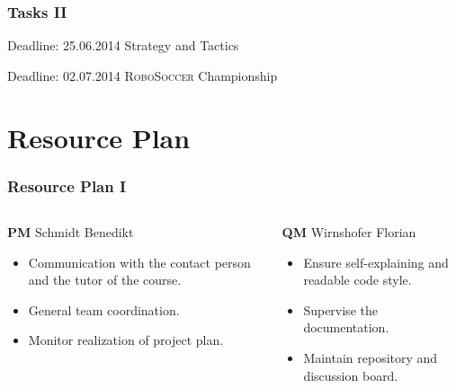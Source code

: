 \documentclass[hyperref={pdfpagelabels=false}]{beamer}
\begin{document}
\begin{frame}
	\frametitle{Tasks II} 
	\begin{block}{Deadline: 25.06.2014}
			Strategy and Tactics
	\end{block}
	\begin{block}{Deadline: 02.07.2014}
			\textsc{RoboSoccer} Championship
	\end{block}
\end{frame}

\section{Resource Plan} 
\begin{frame}
	\frametitle{Resource Plan I}
	\begin{columns}[t]
		\begin{column}{0.50\textwidth}
			\begin{block}{\textbf{PM} Schmidt Benedikt}
				\begin{itemize}
					\item Communication with the contact person and the tutor of the course.
					\item General team coordination.
					\item Monitor realization of project plan.
				\end{itemize}
			\end{block}
		\end{column}
		
		\begin{column}{0.50\textwidth}
			\begin{block}{\textbf{QM} Wirnshofer Florian}
				\begin{itemize}
					\item Ensure self-explaining and readable code style.
					\item Supervise the documentation.
					\item Maintain repository and discussion board.
				\end{itemize}
			\end{block}
		\end{column}
	\end{columns}
\end{frame}
\end{document}

